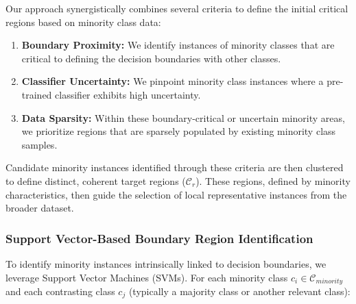 \documentclass{article}
\begin{document}
Our approach synergistically combines several criteria to define the initial critical regions based on minority class data:
\begin{enumerate}
    \item \textbf{Boundary Proximity:} We identify instances of minority classes that are critical to defining the decision boundaries with other classes.
    \item \textbf{Classifier Uncertainty:} We pinpoint minority class instances where a pre-trained classifier exhibits high uncertainty.
    \item \textbf{Data Sparsity:} Within these boundary-critical or uncertain minority areas, we prioritize regions that are sparsely populated by existing minority class samples.
\end{enumerate}
Candidate minority instances identified through these criteria are then clustered to define distinct, coherent target regions ($\mathcal{C}_r$). These regions, defined by minority characteristics, then guide the selection of local representative instances from the broader dataset.

\subsubsection{Support Vector-Based Boundary Region Identification}
\label{sssec:sv_boundary_identification}

To identify minority instances intrinsically linked to decision boundaries, we leverage Support Vector Machines (SVMs). For each minority class $c_i \in \mathcal{C}_{minority}$ and each contrasting class $c_j$ (typically a majority class or another relevant class):
\end{document}
